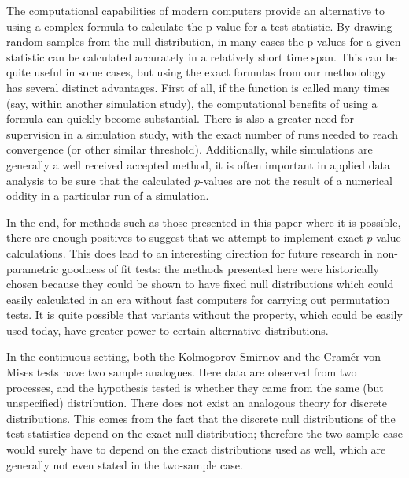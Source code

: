 The computational capabilities of modern computers provide an alternative to using a complex formula to
calculate the p-value for a test statistic. By drawing random samples from the null distribution, in many
cases the p-values for a given statistic can be calculated accurately in a relatively short time span.
This can be quite useful in some cases, but using the exact formulas from our methodology has several
distinct advantages. First of all, if the function is called many times (say, within another simulation
study), the computational benefits of using a formula can quickly become substantial. There is also a greater need
for supervision in a simulation study, with the exact number of runs needed to reach convergence (or other 
similar threshold). Additionally, while
simulations are generally a well received accepted method, it is often important in applied data analysis
to be sure that the calculated $p$-values are not the result of a numerical oddity in a particular
run of a simulation. 

In the end, for methods such as those presented in this paper where it is possible,
there are enough positives to suggest that we attempt to implement exact $p$-value calculations. This does lead
to an interesting direction for future research in non-parametric goodness of fit tests: the methods presented
here were historically chosen because they could be shown to have fixed null distributions which could easily
calculated in an era without fast computers for carrying out permutation tests. It is quite possible that
variants without the property, which could be easily used today, have greater power to certain alternative 
distributions.


In the continuous setting, both the Kolmogorov-Smirnov and the Cram\'{e}r-von Mises tests have two sample analogues. Here data are
observed from two processes, and the hypothesis tested is whether they came from the same (but unspecified) distribution. There
does not exist an analogous theory for discrete distributions. This comes from the fact that the discrete null distributions
of the test statistics depend on the exact null distribution; therefore the two sample case would surely have to depend
on the exact distributions used as well, which are generally not even stated in the two-sample case. 

